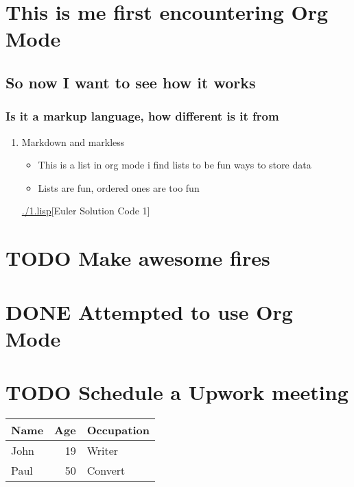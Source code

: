 \documentclass[11pt]{article}
\date{\today}
\title{}
\begin{document}
\tableofcontents

\section{This is me first encountering Org Mode}
\label{sec:orgf2dfd6e}
\subsection{So now I want to see how it works}
\label{sec:org7566e59}
\subsubsection{Is it a markup language, how different is it from}
\label{sec:orgd80cde8}
\begin{enumerate}
\item Markdown and markless
\label{sec:orgd89e76a}

\begin{itemize}
\item This is a list in org mode
i find lists to be fun ways to store data

\item Lists are fun, ordered ones are too fun
\end{itemize}

\url{./1.lisp}[Euler Solution Code 1]
\end{enumerate}

\section{{\bfseries\sffamily TODO} Make awesome fires}
\label{sec:org82e98c2}
\section{{\bfseries\sffamily DONE} Attempted to use Org Mode}
\label{sec:org2999de9}

\section{{\bfseries\sffamily TODO} Schedule a Upwork meeting}
\label{sec:orgb50892c}
\begin{center}
\begin{tabular}{lrl}
Name & Age & Occupation\\[0pt]
\hline
John & 19 & Writer\\[0pt]
Paul & 50 & Convert\\[0pt]
\end{tabular}
\end{center}
\end{document}
